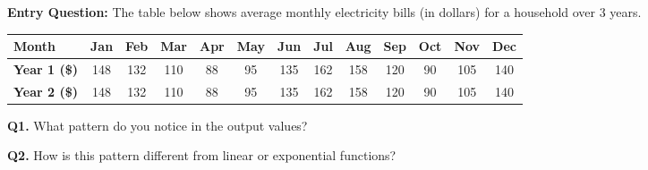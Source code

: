 \documentclass[10pt]{article}
\begin{document}
\begin{hookbox}
\textbf{Entry Question:} The table below shows average monthly electricity
bills (in dollars) for a household over 3 years.

\vspace{4pt}
\begin{center}
\renewcommand{\arraystretch}{1.3}
\small
\begin{tabular}{|l|c|c|c|c|c|c|c|c|c|c|c|c|}
\hline
\textbf{Month} & Jan & Feb & Mar & Apr & May & Jun & Jul & Aug & Sep & Oct & Nov & Dec \\
\hline
\textbf{Year 1 (\$)} & 148 & 132 & 110 & 88 & 95 & 135 & 162 & 158 & 120 & 90 & 105 & 140 \\
\hline
\textbf{Year 2 (\$)} & 148 & 132 & 110 & 88 & 95 & 135 & 162 & 158 & 120 & 90 & 105 & 140 \\
\hline
\end{tabular}
\end{center}

\vspace{6pt}
\textbf{Q1.} What pattern do you notice in the output values?

\textbf{Q2.} How is this pattern different from linear or exponential functions?
\end{hookbox}

\vspace{0.08in}
\end{document}
